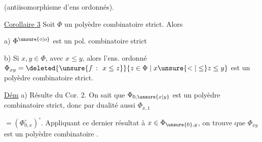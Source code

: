 
(antiisomorphisme d'ens ordonnés).

\uline{Corollaire 3} Soit $\Phi$ un polyèdre combinatoire strict. Alors

a) $\Phi^{\unsure{\circ|o}}$ est un pol. combinatoire strict

b) Si $x,y\in\Phi$, avec $x\leq y$, alors l'ens. ordonné $\Phi_{xy}=\deleted{\unsure{f\ \colon\ x\leq z}}\{z\in\Phi\mid x\unsure{<|\leq}z\leq y\}$ est un polyèdre combinatoire strict.

\uline{Dém} a) Résulte du Cor. 2. On sait que $\Phi_{0,\unsure{x|y}}$  est un polyèdre combinatoire strict, donc par dualité aussi $\Phi_{x,1}$  

$=(\Phi^{\circ}_{0,x})^\circ$. Appliquant ce dernier résultat à $x\in\Phi_{\unsure{0},y}$, on trouve que $\Phi_{xy}$ est un polyèdre combinatoire .


